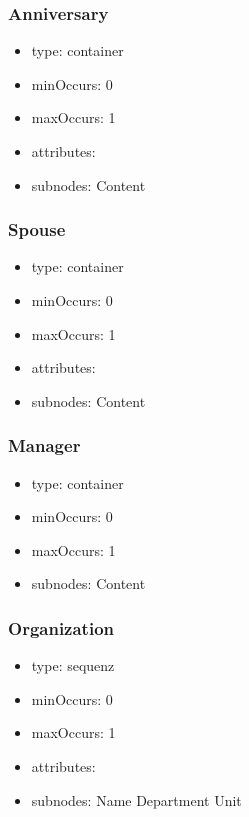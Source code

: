 \documentclass[a4paper,11pt]{article}
\begin{document}
\subsubsection{Anniversary}
\begin{itemize}
  \item type: container
  \item minOccurs: 0
  \item maxOccurs: 1
  \item attributes:
  \item subnodes:
  \subitem Content
\end{itemize}

\subsubsection{Spouse}
\begin{itemize}
  \item type: container
  \item minOccurs: 0
  \item maxOccurs: 1
  \item attributes:
  \item subnodes:
  \subitem Content
\end{itemize}

\subsubsection{Manager}
\begin{itemize}
  \item type: container
  \item minOccurs: 0
  \item maxOccurs: 1
  \item subnodes:
  \subitem Content
\end{itemize}

\subsubsection{Organization}
\begin{itemize}
  \item type: sequenz
  \item minOccurs: 0
  \item maxOccurs: 1
  \item attributes:
  \item subnodes:
  \subitem Name
  \subitem Department
  \subitem Unit
\end{itemize}
\end{document}
